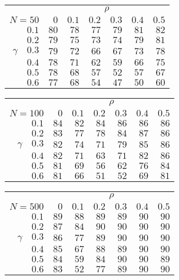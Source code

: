 \begin{tabular}{r|rrrrrr}
\hline\hline
 &\multicolumn{6}{c}{$\rho$} \\ 
 $N = 50$ & $0$ & $0.1$ & $0.2$ & $0.3$ & $0.4$ & $0.5$ \\ 
 \hline$0.1$ & $80$ & $78$ & $77$ & $79$ & $81$ & $82$\\ 
$0.2$ & $79$ & $75$ & $73$ & $74$ & $79$ & $81$\\ 
$\gamma\quad$$0.3$ & $79$ & $72$ & $66$ & $67$ & $73$ & $78$\\ 
$0.4$ & $78$ & $71$ & $62$ & $59$ & $66$ & $75$\\ 
$0.5$ & $78$ & $68$ & $57$ & $52$ & $57$ & $67$\\ 
$0.6$ & $77$ & $68$ & $54$ & $47$ & $50$ & $60$\\ 
 \hline 
 \end{tabular}
 
 \vspace{2em} 
 
\begin{tabular}{r|rrrrrr}
\hline\hline
 &\multicolumn{6}{c}{$\rho$} \\ 
 $N = 100$ & $0$ & $0.1$ & $0.2$ & $0.3$ & $0.4$ & $0.5$ \\ 
 \hline$0.1$ & $84$ & $82$ & $84$ & $86$ & $86$ & $86$\\ 
$0.2$ & $83$ & $77$ & $78$ & $84$ & $87$ & $86$\\ 
$\gamma\quad$$0.3$ & $82$ & $74$ & $71$ & $79$ & $85$ & $86$\\ 
$0.4$ & $82$ & $71$ & $63$ & $71$ & $82$ & $86$\\ 
$0.5$ & $81$ & $69$ & $56$ & $62$ & $76$ & $84$\\ 
$0.6$ & $81$ & $66$ & $51$ & $52$ & $69$ & $81$\\ 
 \hline 
 \end{tabular}
 
 \vspace{2em} 
 
\begin{tabular}{r|rrrrrr}
\hline\hline
 &\multicolumn{6}{c}{$\rho$} \\ 
 $N = 500$ & $0$ & $0.1$ & $0.2$ & $0.3$ & $0.4$ & $0.5$ \\ 
 \hline$0.1$ & $89$ & $88$ & $89$ & $89$ & $90$ & $90$\\ 
$0.2$ & $87$ & $84$ & $90$ & $90$ & $90$ & $90$\\ 
$\gamma\quad$$0.3$ & $86$ & $77$ & $89$ & $90$ & $90$ & $90$\\ 
$0.4$ & $85$ & $67$ & $88$ & $89$ & $90$ & $90$\\ 
$0.5$ & $84$ & $59$ & $84$ & $90$ & $90$ & $89$\\ 
$0.6$ & $83$ & $52$ & $77$ & $89$ & $90$ & $90$\\ 
 \hline 
 \end{tabular}